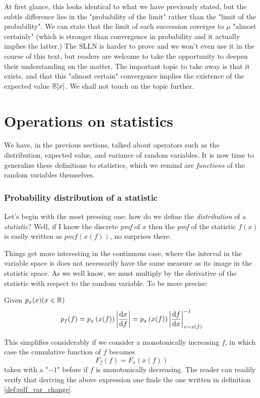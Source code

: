 At first glance, this looks identical to what we have previously stated, but the subtle difference lies in the "probability of the limit" rather than the "limit of the probability". We can state that the limit of each succession coverges to $\mu$ "almost certainly" (which is stronger than convergence in probability and it actually implies the latter.) The SLLN is harder to prove and we won't even use it in the course of this text, but readers are welcome to take the opportunity to deepen their understanding on the matter. The important topic to take away is that it exists, and that this "almost certain" convergence implies the existence of the expected value $\mathbb{E}[x]$. We shall not touch on the topic further.

\section{Operations on statistics}
\label{sec:stat-operations}

We have, in the previous sections, talked about operators such as the distribution, expected value, and variance of random variables. It is now time to generalize these definitions to statistics, which we remind are \emph{functions} of the random variables themselves. 

\subsubsection{Probability distribution of a statistic}
Let's begin with the most pressing one: how do we define the \emph{distribution} of a \emph{statistic}? Well, if I know the discrete \emph{pmf} of $x$ then the \emph{pmf} of the statistic $f(x)$ is easily written as $pmf\left(x(f)\right)$, no surprises there. 

Things get more interesting in the continuous case, where the interval in the variable space is does not necessarily have the same measure as its image in the statistic space. As we well know, we must multiply by the derivative of the statistic with respect to the random variable. To be more precise:
\begin{definition}
	Given $p_x(x) (x\in\mathbb{R})$
	\[
	p_f(f) = p_x\left(x(f)\right)\left|\frac{\mathrm{d} x}{\mathrm{d} f}\right| = p_x\left(x(f)\right)\left|\frac{\mathrm{d} f}{\mathrm{d} x}\right|^{-1}_{x=x(f)} 
	\]
\label{def:pdf_var_change}
\end{definition}

This simplifies considerably if we consider a monotonically increasing $f$, in which case the cumulative function of $f$ becomes
	\[
	F_f(f)= F_x\left(x(f)\right)
	\]
taken with a "$-1$" before if $f$ is monotonically decreasing. The reader can readily verify that deriving the above expression one finds the one written in definition \ref{def:pdf_var_change}


